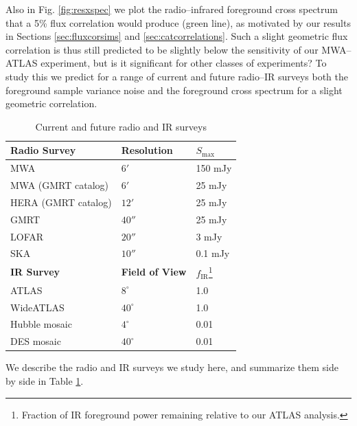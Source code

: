 \documentclass[numberedappendix]{emulateapj}
\newcommand{\ir}{\text{IR}}
\begin{document}
Also in Fig. \ref{fig:resxspec} we plot the radio--infrared foreground cross spectrum that a 5\% flux correlation would produce (green line), as motivated by our results in Sections \ref{sec:fluxcorsims} and \ref{sec:catcorrelations}. Such a slight geometric flux correlation is thus still predicted to be slightly below the sensitivity of our MWA--ATLAS experiment, but is it significant for other classes of experiments? To study this we predict for a range of current and future radio--IR surveys both the foreground sample variance noise and the foreground cross spectrum for a slight geometric correlation. 

\begin{table}
\caption{Current and future radio and IR surveys\label{tab:expts}}
\begin{tabular}{|l | l | l|}
\hline
\textbf{Radio Survey} & \textbf{Resolution} & \textbf{$S_\text{max}$} \\
\hline
MWA & $6'$ & 150 mJy \\
MWA (GMRT catalog) & $6'$ & 25 mJy \\
HERA (GMRT catalog) & $12'$ & 25 mJy \\
GMRT & $40''$ & 25 mJy \\
LOFAR & $20''$ & 3 mJy \\
SKA & $10''$ & 0.1 mJy \\
\hline\hline
\textbf{IR Survey} & \textbf{Field of View} & \textbf{$f_\ir$}\footnote{Fraction of IR foreground power remaining relative to our ATLAS analysis.} \\
\hline
ATLAS & $8^\circ$ & 1.0 \\
WideATLAS & $40^\circ$ & 1.0 \\
Hubble mosaic & $4^\circ$ & 0.01 \\
DES mosaic & $40^\circ$ & 0.01 \\
\hline
\end{tabular}
\end{table}


We describe the radio and IR surveys we study here, and summarize them side by side in Table \ref{tab:expts}. \\
\end{document}
